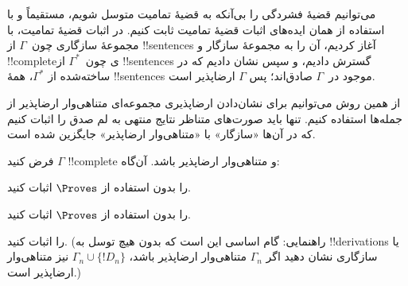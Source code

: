 \documentclass[../../../include/open-logic-section]{subfiles}
\begin{document}
      {}
      {}


می‌توانیم قضیهٔ فشردگی را بی‌آنکه به قضیهٔ تمامیت متوسل شویم، مستقیماً
و با استفاده از همان ایده‌های اثبات قضیهٔ تمامیت ثابت کنیم. در اثبات
قضیهٔ تمامیت، با مجموعهٔ سازگاری چون~$\Gamma$ از !!{sentence}s آغاز
کردیم، آن را به مجموعهٔ سازگار و
!!{complete}ی چون~$\Gamma^*$ از !!{sentence}s گسترش دادیم، و سپس نشان
دادیم که در  ساخته‌شده از $\Gamma^*$، همهٔ !!{sentence}s
موجود در~$\Gamma$ صادق‌اند؛ پس $\Gamma$ ارضاپذیر است.

از همین روش می‌توانیم برای نشان‌دادن ارضاپذیری مجموعه‌ای متناهی‌وار
ارضاپذیر از جمله‌ها استفاده کنیم. تنها باید صورت‌های متناظر نتایج منتهی
به لم صدق را اثبات کنیم که در آن‌ها «سازگار» با «متناهی‌وار ارضاپذیر»
جایگزین شده است.

\begin{prop}
فرض کنید $\Gamma$ !!{complete} و متناهی‌وار ارضاپذیر باشد. آن‌گاه:
\begin{enumerate}


\end{enumerate}
\end{prop}

\begin{prob}
 را بدون استفاده از $\Proves$
اثبات کنید.
\end{prob}
\tagendprob

\begin{prob}
 را بدون استفاده از $\Proves$
اثبات کنید.
\end{prob}
\tagendprob


\begin{prob}
 را اثبات کنید. (راهنمایی: گام
اساسی این است که بدون هیچ توسل به !!{derivation}s یا سازگاری نشان دهید
اگر $\Gamma_n$ متناهی‌وار ارضاپذیر باشد، $\Gamma_n \cup \{!D_n\}$ نیز
متناهی‌وار ارضاپذیر است.)
\end{prob}
\tagendprob
\end{document}

